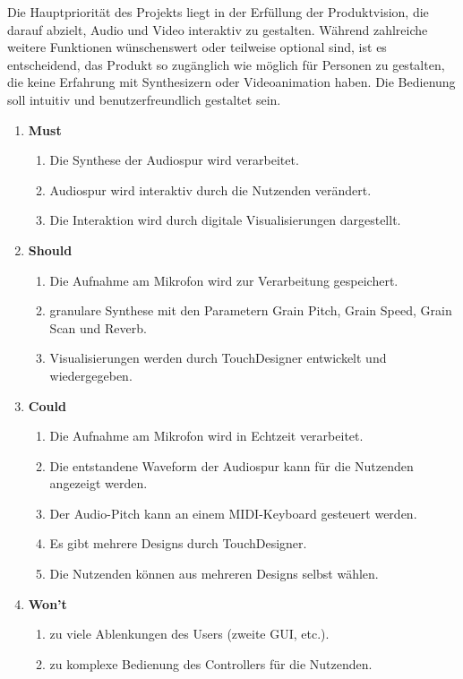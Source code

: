 \documentclass[12pt]{scrartcl}%
\theoremstyle{nonumberplain}
\begin{document}
Die Hauptpriorität des Projekts liegt in der Erfüllung der Produktvision, die darauf abzielt, Audio und Video interaktiv zu gestalten. Während zahlreiche weitere Funktionen wünschenswert oder teilweise optional sind, ist es entscheidend, das Produkt so zugänglich wie möglich für Personen zu gestalten, die keine Erfahrung mit Synthesizern oder Videoanimation haben. Die Bedienung soll intuitiv und benutzerfreundlich gestaltet sein.
\begin{enumerate}[]
\item \textbf{Must}
  \begin{enumerate}[-]
  \item Die Synthese der Audiospur wird verarbeitet.
  \item Audiospur wird interaktiv durch die Nutzenden verändert.
  \item Die Interaktion wird durch digitale Visualisierungen dargestellt.
  \end{enumerate}
\item \textbf{Should}
  \begin{enumerate}[-]
  \item Die Aufnahme am Mikrofon wird zur Verarbeitung gespeichert.
  \item granulare Synthese mit den Parametern Grain Pitch, Grain Speed, Grain Scan und Reverb.
  \item Visualisierungen werden durch TouchDesigner entwickelt und wiedergegeben.
  \end{enumerate}
\item \textbf{Could}
  \begin{enumerate}[-]
  \item Die Aufnahme am Mikrofon wird in Echtzeit verarbeitet.
  \item Die entstandene Waveform der Audiospur kann für die Nutzenden angezeigt werden.
  \item Der Audio-Pitch kann an einem MIDI-Keyboard gesteuert werden.
  \item Es gibt mehrere Designs durch TouchDesigner.
  \item Die Nutzenden können aus mehreren Designs selbst wählen.
  \end{enumerate}
\item \textbf{Won't}
  \begin{enumerate}[-]
  \item zu viele Ablenkungen des Users (zweite GUI, etc.).
  \item zu komplexe Bedienung des Controllers für die Nutzenden.
  \end{enumerate}
\end{enumerate}
\end{document}
